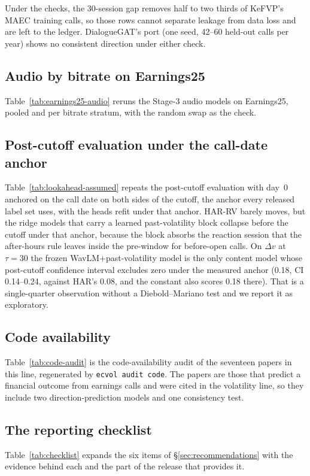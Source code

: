 Under the checks, the 30-session gap removes half to two thirds of KeFVP's MAEC
training calls, so those rows cannot separate leakage from data loss and are left
to the ledger. DialogueGAT's port (one seed, 42--60 held-out calls per year) shows
no consistent direction under either check.





\subsection{Audio by bitrate on Earnings25}
Table~\ref{tab:earnings25-audio} reruns the Stage-3 audio models on Earnings25,
pooled and per bitrate stratum, with the random swap as the check.


\subsection{Post-cutoff evaluation under the call-date anchor}
Table~\ref{tab:lookahead-assumed} repeats the post-cutoff evaluation with day~0
anchored on the call date on both sides of the cutoff, the anchor every released
label set uses, with the heads refit under that anchor. HAR-RV barely moves, but the ridge models that carry a learned
past-volatility block collapse before the cutoff under that anchor, because the
block absorbs the reaction session that the after-hours rule leaves inside the
pre-window for before-open calls. On $\Delta v$ at $\tau{=}30$ the frozen
WavLM$+$past-volatility model is the only content model whose post-cutoff
confidence interval excludes zero under the measured anchor (0.18, CI 0.14--0.24,
against HAR's 0.08, and the constant also scores 0.18 there).
That is a single-quarter observation without a Diebold--Mariano test and we report
it as exploratory.


\subsection{Code availability}
Table~\ref{tab:code-audit} is the code-availability audit of the seventeen papers
in this line, regenerated by \texttt{ecvol audit code}. The papers are those that
predict a financial outcome from earnings calls and were cited in the
volatility line, so they include two direction-prediction models and one
consistency test.


\subsection{The reporting checklist}
Table~\ref{tab:checklist} expands the six items of \S\ref{sec:recommendations}
with the evidence behind each and the part of the release that provides it.

